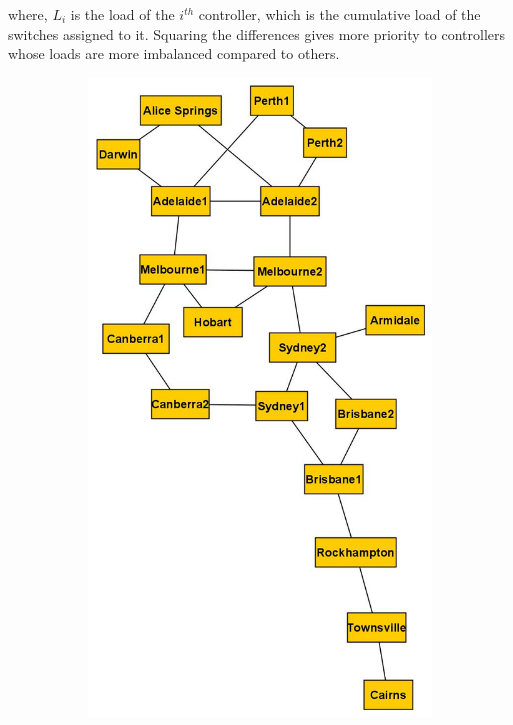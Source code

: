 \documentclass[final,5p,times]{cas-dc}
\begin{document}
	where, $L_i$ is the load of the $i^{th}$ controller, which is the cumulative load of the switches assigned to it. Squaring the differences gives more priority to controllers whose loads are more imbalanced compared to others.
	
	\begin{figure}
		\centering
		\begin{subfigure}{0.3\textwidth}
			\includegraphics[width=\linewidth]{Images/Aarnet_Graph.jpg}

\end{subfigure}
\end{figure}
\end{document}
